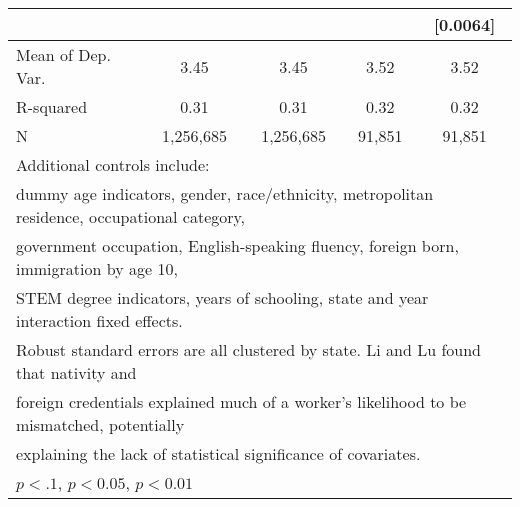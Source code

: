 \begin{table}[htbp]
\begin{tabular}{l*{4}{c}}
                    &                     &                     &                     &    [0.0064]         \\
\midrule
Mean of Dep. Var.   &        3.45         &        3.45         &        3.52         &        3.52         \\
R-squared           &        0.31         &        0.31         &        0.32         &        0.32         \\
N                   &   1,256,685         &   1,256,685         &      91,851         &      91,851         \\
\bottomrule
\multicolumn{5}{l}{\footnotesize Additional controls include:}\\
\multicolumn{5}{l}{\footnotesize dummy age indicators, gender, race/ethnicity, metropolitan residence, occupational category,}\\
\multicolumn{5}{l}{\footnotesize government occupation, English-speaking fluency, foreign born, immigration by age 10,}\\
\multicolumn{5}{l}{\footnotesize STEM degree indicators, years of schooling, state and year interaction fixed effects.}\\
\multicolumn{5}{l}{\footnotesize Robust standard errors are all clustered by state. Li and Lu found that nativity and}\\
\multicolumn{5}{l}{\footnotesize foreign credentials explained much of a worker's likelihood to be mismatched, potentially}\\
\multicolumn{5}{l}{\footnotesize explaining the lack of statistical significance of covariates.}\\
\multicolumn{5}{l}{\footnotesize \sym{*} \(p<.1\), \sym{**} \(p<0.05\), \sym{***} \(p<0.01\)}\\
\end{tabular}
\end{table}

